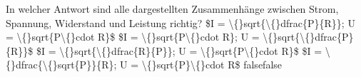     {In welcher Antwort sind alle dargestellten Zusammenhänge zwischen Strom, Spannung, Widerstand und Leistung richtig?}
    {\$I = \textbackslash\{\}sqrt\{\textbackslash\{\}dfrac\{P\}\{R\}\};  U = \textbackslash\{\}sqrt\{P\textbackslash\{\}cdot R\}\$}
    {\$I = \textbackslash\{\}sqrt\{P\textbackslash\{\}cdot R\};  U = \textbackslash\{\}sqrt\{\textbackslash\{\}dfrac\{P\}\{R\}\}\$}
    {\$I = \textbackslash\{\}sqrt\{\textbackslash\{\}dfrac\{R\}\{P\}\};  U = \textbackslash\{\}sqrt\{P\textbackslash\{\}cdot R\}\$}
    {\$I = \textbackslash\{\}dfrac\{\textbackslash\{\}sqrt\{P\}\}\{R\};  U = \textbackslash\{\}sqrt\{P\}\textbackslash\{\}cdot R\$}
    {false}{false}
